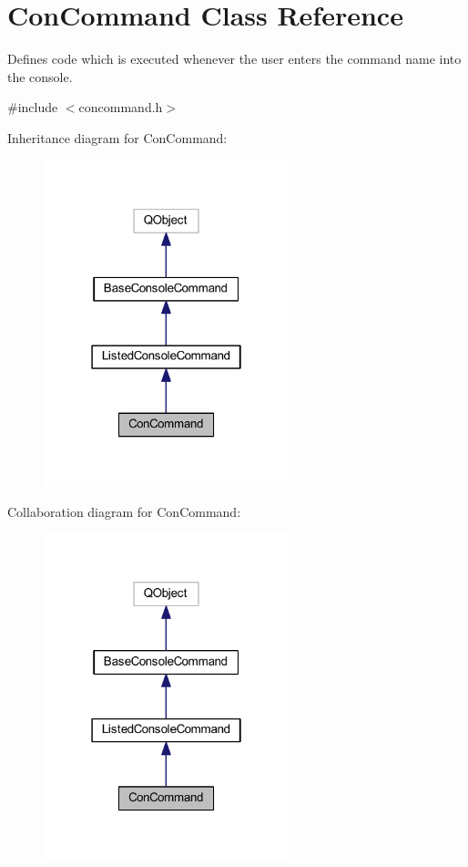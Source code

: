 \hypertarget{class_con_command}{\section{Con\-Command Class Reference}
\label{class_con_command}
}


Defines code which is executed whenever the user enters the command name into the console.  




{\ttfamily \#include $<$concommand.\-h$>$}



Inheritance diagram for Con\-Command\-:\nopagebreak
\begin{figure}[H]
\begin{center}
\leavevmode
\includegraphics[width=202pt]{class_con_command__inherit__graph}
\end{center}
\end{figure}


Collaboration diagram for Con\-Command\-:\nopagebreak
\begin{figure}[H]
\begin{center}
\leavevmode
\includegraphics[width=202pt]{class_con_command__coll__graph}
\end{center}
\end{figure}
